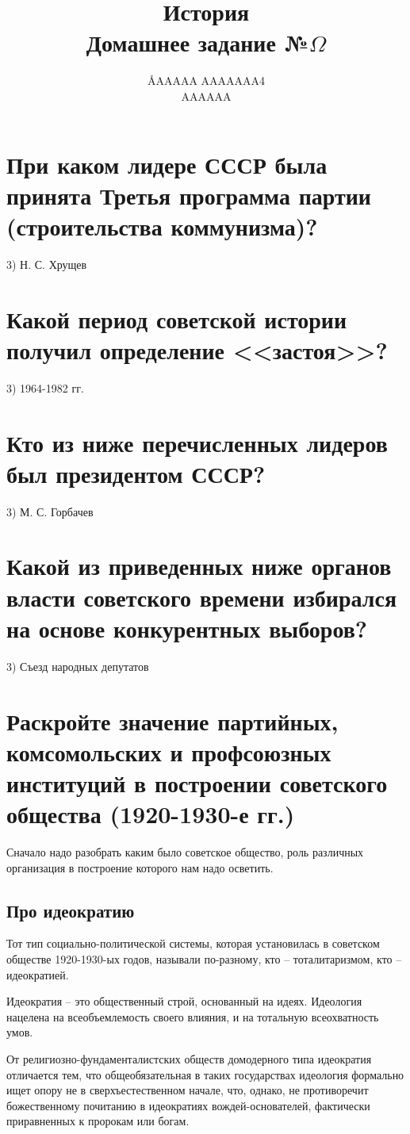 \documentclass[12pt]{article}
\title{История \\ Домашнее задание №$\Omega$}
\author{\AA{AAAAA AAAAAAA}{4} \\ AAAAAA}
\begin{document}
  \maketitle

  \section{При каком лидере СССР была принята Третья программа партии (строительства коммунизма)?}
  3) Н. С. Хрущев

  \section{Какой период советской истории получил определение <<застоя>>?}
  3) 1964-1982 гг.

  \section{Кто из ниже перечисленных лидеров был президентом СССР?}
  3) М. С. Горбачев

  \section{Какой из приведенных ниже органов власти советского времени избирался на основе конкурентных выборов?}
  3) Съезд народных депутатов

  \newpage
  \section{Раскройте значение партийных, комсомольских и профсоюзных институций в построении советского общества (1920-1930-е гг.)}
  Сначало надо разобрать каким было советское общество, роль различных организация в построение которого нам надо осветить.

  \subsection{Про идеократию}
  Тот тип социально-политической системы, которая установилась в советском обществе 1920-1930-ых годов,
  называли по-разному, кто -- тоталитаризмом, кто -- идеократией.

  Идеократия -- это общественный строй, основанный на идеях.
  Идеология нацелена на всеобъемлемость своего влияния, и на тотальную всеохватность умов.

  От религиозно-фундаменталистских обществ домодерного типа идеократия отличается тем,
  что общеобязательная в таких государствах идеология формально ищет опору не в сверхъестественном начале,
  что, однако, не противоречит божественному почитанию в идеократиях вождей-основателей, фактически приравненных к пророкам или богам.
\end{document}
